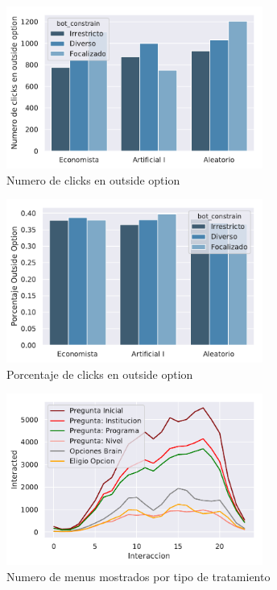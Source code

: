 \documentclass[12pt]{article}
\begin{document}
\begin{figure}[h]
  \caption{Numero de clicks en outside option}
  \centering
  \includegraphics[width=0.75\textwidth]{Outside_option_clicks.pdf}
\end{figure}


\begin{figure}[h]
\caption{Porcentaje de clicks en outside option}
\centering
\includegraphics[width=0.75\textwidth]{outside_option_percentage.pdf}
\end{figure}



\begin{figure}[h]
\caption{Numero de menus mostrados por tipo de tratamiento}
\centering
\includegraphics[width=0.75\textwidth]{Interaction_type.pdf}
\end{figure}
\end{document}
